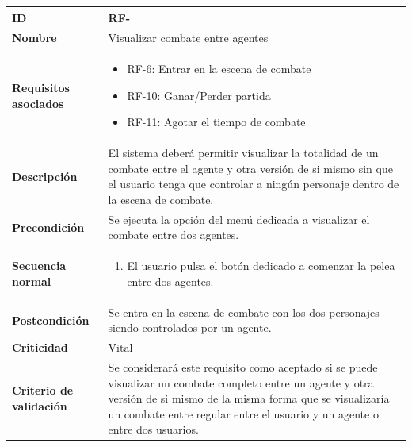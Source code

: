 \begin{center}
	\begin{tabular}{ | p{4.7cm} | p{10cm} | } 
		\hline
		
		\textbf{ID} & RF-\arabic{contador_requisitos_funcionales}
		{contador_requisitos_funcionales} \\
		
		\hline 
		\textbf{Nombre} &
		Visualizar combate entre agentes\\ 
		
		\hline
		\textbf{Requisitos asociados} & 
		\begin{itemize}
			\item RF-6: Entrar en la escena de combate
			\item RF-10: Ganar/Perder partida
			\item RF-11: Agotar el tiempo de combate
		\end{itemize}\\
		
		\hline
		\textbf{Descripción} & 
		El sistema deberá permitir visualizar la totalidad de un combate entre el agente y otra versión de si mismo sin que el usuario tenga que controlar a ningún personaje dentro de la escena de combate.\\
		
		\hline
		\textbf{Precondición} & 
		Se ejecuta la opción del menú dedicada a visualizar el combate entre dos agentes.\\
		
		\hline
		\textbf{Secuencia normal} &
		\begin{enumerate}
			\item El usuario pulsa el botón dedicado a comenzar la pelea entre dos agentes.
		\end{enumerate}
		\\
		
		\hline
		\textbf{Postcondición} & 
		Se entra en la escena de combate con los dos personajes siendo controlados por un agente.\\
		
		\hline 
		\textbf{Criticidad} &
		Vital\\
		
		\hline 
		\textbf{Criterio de validación} & 
		Se considerará este requisito como aceptado si se puede visualizar un combate completo entre un agente y otra versión de si mismo de la misma forma que se visualizaría un combate entre regular entre el usuario y un agente o entre dos usuarios.\\
		
		\hline
	\end{tabular}
\end{center}

